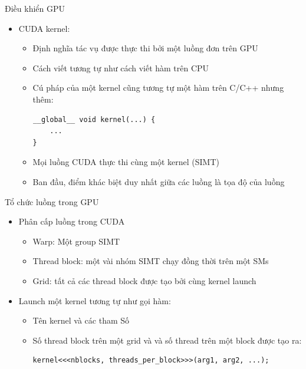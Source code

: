 \documentclass[10pt]{beamer}
\theoremstyle{remark}
\numberwithin{algocf}{section}
\numberwithin{equation}{section}
\numberwithin{dl}{section}
\numberwithin{figure}{section}
\begin{document}
\begin{frame}[fragile]{Điều khiển GPU}
    \begin{itemize}
        \item CUDA kernel:
        \begin{itemize}
            \item Định nghĩa tác vụ được thực thi bởi một luồng đơn trên GPU
            \item Cách viết tương tự như cách viết hàm trên CPU
            \item Cú pháp của một kernel cũng tương tự một hàm trên C/C++ nhưng thêm:
            \begin{verbatim}
__global__ void kernel(...) {
    ...
}
            \end{verbatim}
            \item Mọi luồng CUDA thực thi cùng một kernel (SIMT)
            \item Ban đầu, điểm khác biệt duy nhất giữa các luồng là tọa độ của luồng
        \end{itemize}
    \end{itemize}
\end{frame}

\begin{frame}[fragile]{Tổ chức luồng trong GPU}
    \begin{itemize}
        \item Phân cấp luồng trong CUDA 
        \begin{itemize}
            \item Warp: Một group SIMT
            \item Thread block: một vài nhóm SIMT chạy đồng thời trên một SMs
            \item Grid: tất cả các thread block được tạo bởi cùng kernel launch
        \end{itemize}
        \item Launch một kernel tương tự như gọi hàm:
        \begin{itemize}
            \item Tên kernel và các tham Số
            \item Số thread block trên một grid và và số thread trên một block được tạo ra:
            \begin{verbatim}
kernel<<<nblocks, threads_per_block>>>(arg1, arg2, ...);                
            \end{verbatim}
        \end{itemize}
    \end{itemize}
\end{frame}
\end{document}

